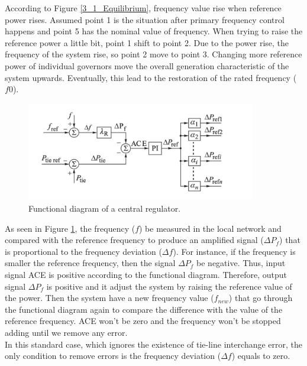 \documentclass{report}
\begin{document}
According to Figure \textcolor{red}{\ref{3_1_Equilibrium}}, frequency value rise when reference power rises. Assumed point 1 is the situation after primary frequency control happens and point 5 has the nominal value of frequency. When trying to raise the reference power a little bit, point 1 shift to point 2. Due to the power rise, the frequency of the system rise, so point 2 move to point 3. Changing more reference power of individual governors move the overall generation characteristic of the system upwards. Eventually, this lead to the restoration of the rated frequency ($f0$).\\

\begin{figure}[htb]
\centering
\includegraphics[width = 0.891\textwidth]{figure/3_1_Functional.png}
\caption{Functional diagram of a central regulator.}
\label{3_1_Functional}
\end{figure}

As seen in Figure \textcolor{red}{\ref{3_1_Functional}}, the frequency ($f$) be measured in the local network and compared with the reference frequency to produce an amplified signal ($\Delta P_f$) that is proportional to the frequency deviation ($\Delta f$). For instance, if the frequency is smaller the reference frequency, then the signal $\Delta P_f$ be negative. Thus, input signal ACE is positive according to the functional diagram. Therefore, output signal $\Delta P_f$ is positive and it adjust the system by raising the reference value of the power. Then the system have a new frequency value ($f_{new}$) that go through the functional diagram again to compare the difference with the value of the reference frequency. ACE won’t be zero and the frequency won’t be stopped adding until we remove any error.\\

In this standard case, which ignores the existence of tie-line interchange error, the only condition to remove errors is the frequency deviation ($\Delta f$) equals to zero.\\
\end{document}
